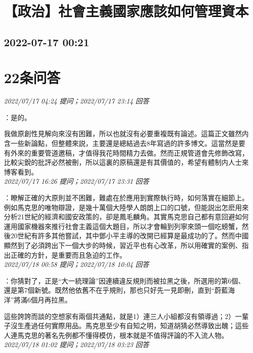 \documentclass[twocolumn]{ctexart}
\begin{document}
\section{【政治】社會主義國家應該如何管理資本}
\subsection{2022-07-17 00:21}


\section{22条问答}

\textit{\hfill\noindent\small 2022/07/17 04:24 提问；2022/07/17 23:14 回答}

：是的。

我做原創性見解向來沒有困難，所以也就沒有必要重複既有論述。這篇正文雖然内含一些新論點，但整體來説，主要還是總結過去8年寫過的許多博文。這當然是要有外來的重要管道邀稿，才值得我花時間精力去做。然而正規管道會先修飾改寫，比較尖銳的批評必然被刪，所以這裏的原稿還是有其價值的，希望有體制内人士來博客看到。
\\

\textit{\hfill\noindent\small 2022/07/17 16:26 提问；2022/07/17 23:31 回答}

：瞭解正確的大原則並不困難，難處在於應用到實際執行時，如何落實在細節上。例如馬克思的唯物辯證，是幾十萬個大陸學人朗朗上口的口號，但能説出怎麽用來分析21世紀的經濟和國安政策的，卻是鳳毛麟角。其實馬克思自己都有意回避如何運用國家機器來推行社會主義這個大題目，所以才會輪到列寧來頭一個吃螃蟹，然後20世紀有許多其他嘗試，其中鄧小平主導的改開已經算是最成功的了。然而中國顯然到了必須跨出下一個大步的時候，習近平也有心改革，所以用確實的案例、指出正確的方針，是重要而且急迫的工作。
\\

\textit{\hfill\noindent\small 2022/07/18 00:58 提问；2022/07/18 10:04 回答}

：你猜對了，正是“大一統理論”因連續違反規則而被拉黑之後，所選用的第6個、還是第7個新號。既然他依舊不在乎規則，那也只好先一見即刪，直到“蔚藍海洋”將滿6個月再拉黑。

這些誇誇而談的空想家有兩個共通點，就是1）連三人小組都沒有領導過；2）一輩子沒生產過任何實際用品。馬克思至少有自知之明，知道胡猜必然導致出醜；這些人連馬克思的著名先例都不懂得模仿，根本就是不值得評論的不入流人物。
\\

\textit{\hfill\noindent\small 2022/07/18 01:02 提问；2022/07/18 03:23 回答}
\end{document}
